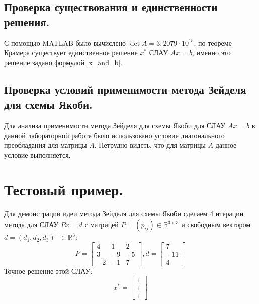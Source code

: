 \documentclass[a4paper, 12pt]{article}
\theoremstyle{definition}
\begin{document}
	\subsection{Проверка существования и единственности решения.}
	
	С помощью MATLAB было вычислено $\det A = 3,2079\cdot 10^{15}$, по теореме Крамера существует единственное решение $x^*$ СЛАУ $Ax=b$, именно это решение задано формулой \eqref{x_and_b}.
	
	\subsection{Проверка условий применимости метода Зейделя для схемы Якоби.}
	
	Для анализа применимости метода Зейделя для схемы Якоби для СЛАУ $Ax=b$ в данной лабораторной работе было использовано условие диагонального преобладания для матрицы $A$. Нетрудно видеть, что для матрицы $A$ данное условие выполняется.
	
	\section{Тестовый пример.}
	
	Для демонстрации идеи метода Зейделя для схемы Якоби сделаем 4 итерации метода для СЛАУ $Px=d$ с матрицей $P=(p_{ij})\in\mathbb{R}^{3\times3}$ и свободным вектором $d=(d_1,d_2,d_3)^\top\in\mathbb{R}^3$:
	\begin{equation}
		P=
		\begin{bmatrix}
			4& 1& 2\\ 
			3& -9& -5\\ 
			-2& -1& 7
		\end{bmatrix},
		d=
		\begin{bmatrix}
			7\\-11\\4
		\end{bmatrix}
	\end{equation}
	Точное решение этой СЛАУ:
	\begin{equation}
		x^*=
		\begin{bmatrix}
			1\\1\\1
		\end{bmatrix}
	\end{equation}
	
\end{document}
